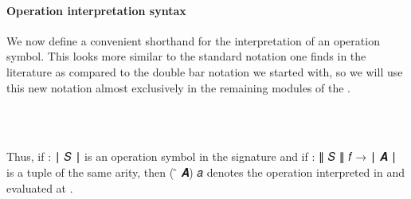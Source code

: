 \paragraph*{Operation interpretation syntax}\label{operation-interpretation-syntax}

We now define a convenient shorthand for the interpretation of an operation symbol. This looks more similar to the standard notation one finds in the literature as compared to the double bar notation we started with, so we will use this new notation almost exclusively in the remaining modules of the \ualib.
\ccpad
\begin{code}%
\>[1]\AgdaSpace{}%
\AgdaSymbol{:}\AgdaSpace{}%
\AgdaSymbol{(}\AgdaSpace{}%
\AgdaSymbol{:}\AgdaSpace{}%
\AgdaSpace{}%
\AgdaSpace{}%
\AgdaSymbol{)(}\AgdaSpace{}%
\AgdaSymbol{:}\AgdaSpace{}%
\AgdaSpace{}%
\AgdaSpace{}%
\AgdaSymbol{)}\AgdaSpace{}%
\AgdaSpace{}%
\AgdaSymbol{(}\AgdaSpace{}%
\AgdaSpace{}%
\AgdaSpace{}%
%
\>[48]%
\>[51]\AgdaSpace{}%
\AgdaSpace{}%
\AgdaSymbol{)}\AgdaSpace{}%
\AgdaSpace{}%
\AgdaSpace{}%
\AgdaSpace{}%
\<%
\\
%
\\[\AgdaEmptyExtraSkip]%
%
\>[1]\AgdaSpace{}%
\AgdaSpace{}%
\AgdaSpace{}%
\AgdaSymbol{=}\AgdaSpace{}%
\AgdaSpace{}%
\AgdaSpace{}%
\AgdaSpace{}%
\AgdaSymbol{(}\AgdaSpace{}%
\AgdaSpace{}%
\AgdaSpace{}%
\AgdaSymbol{)}\AgdaSpace{}%
\<%
\end{code}
\ccpad
Thus, if  \as : \af ∣ \ab 𝑆 \af ∣ is an operation symbol in the signature  and if  \as : \af ∥ \ab 𝑆 \af ∥ \ab 𝑓 \as → \af ∣ \ab 𝑨 \af ∣ is a tuple of the same arity, then ( \af ̂ \ab 𝑨) \ab 𝑎 denotes the operation  interpreted in  and evaluated at .



